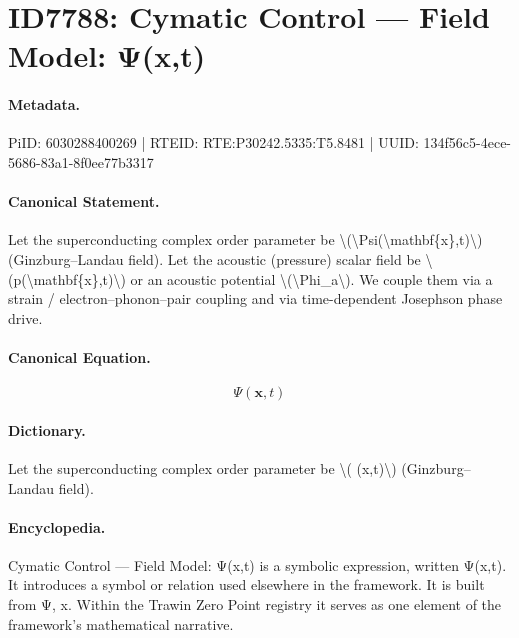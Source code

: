 \section*{ID7788: Cymatic Control — Field Model: Ψ(x,t)}
\paragraph{Metadata.}
PiID: 6030288400269 | RTEID: RTE:P30242.5335:T5.8481 | UUID: 134f56c5-4ece-5686-83a1-8f0ee77b3317

\paragraph{Canonical Statement.}
Let the superconducting complex order parameter be \textbackslash{}(\textbackslash{}Psi(\textbackslash{}mathbf\{x\},t)\textbackslash{}) (Ginzburg–Landau field). Let the acoustic (pressure) scalar field be \textbackslash{}(p(\textbackslash{}mathbf\{x\},t)\textbackslash{}) or an acoustic potential \textbackslash{}(\textbackslash{}Phi\_a\textbackslash{}). We couple them via a strain / electron–phonon–pair coupling and via time-dependent Josephson phase drive.

\paragraph{Canonical Equation.}
\[
\Psi(\mathbf{x},t)
\]

\paragraph{Dictionary.}
Let the superconducting complex order parameter be \textbackslash{}( (x,t)\textbackslash{}) (Ginzburg–Landau field).

\paragraph{Encyclopedia.}
Cymatic Control — Field Model: Ψ(x,t) is a symbolic expression, written Ψ(x,t). It introduces a symbol or relation used elsewhere in the framework. It is built from Ψ, x. Within the Trawin Zero Point registry it serves as one element of the framework's mathematical narrative.
